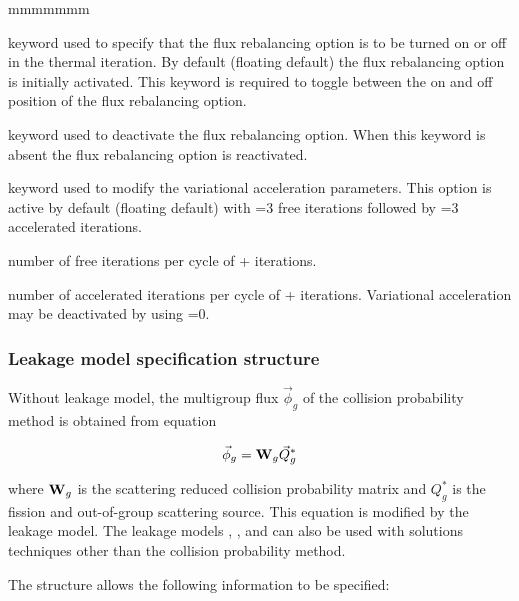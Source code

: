 \begin{ListeDeDescription}{mmmmmmm}
\item[\moc{REBA}] keyword used to specify that the flux rebalancing option is
to be turned on or off in the thermal iteration. By default (floating default)
the flux rebalancing option is initially activated. This keyword is required to
toggle between the on and off position of the flux rebalancing option. 

\item[\moc{OFF}] keyword used to deactivate the flux rebalancing option. When
this keyword is absent the flux rebalancing option is reactivated.

\item[\moc{ACCE}] keyword used to modify the variational acceleration
parameters. This option is active by default (floating default) with
=3 free iterations followed by =3 accelerated
iterations. 

\item[\dusa{nlibre}] number of free iterations per cycle of
+ iterations. 

\item[\dusa{naccel}] number of accelerated iterations per cycle of
+ iterations. Variational acceleration may be
deactivated by using =0.

\end{ListeDeDescription}

\subsubsection{Leakage model specification structure}\label{sect:descleak}

Without leakage model, the multigroup flux $\vec\phi_g$ of the collision
probability method is obtained from equation

\begin{equation}
\vec\phi_g={\bf W}_g \vec Q^{*}_g
\label{eq:eq3.64}
\end{equation}

\noindent where ${\bf W}_g$ is the scattering reduced collision probability matrix
and $ Q^{*}_g$ is the fission and out-of-group scattering source. This equation is
modified by the leakage model. The leakage models , , 
and  can also be used with solutions techniques other than the collision
probability method.

\vskip 0.2cm

The  structure allows the following information to be specified:


